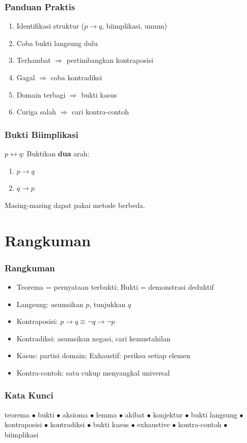 \documentclass[handout]{beamer}
\theoremstyle{definition}
\theoremstyle{example}
\begin{document}
\begin{frame}
\frametitle{Panduan Praktis}
\begin{enumerate}
  \item Identifikasi struktur ($p \to q$, biimplikasi, umum)
  \item Coba bukti langsung dulu
  \item Terhambat $\Rightarrow$ pertimbangkan kontraposisi
  \item Gagal $\Rightarrow$ coba kontradiksi
  \item Domain terbagi $\Rightarrow$ bukti kasus
  \item Curiga salah $\Rightarrow$ cari kontra-contoh
\end{enumerate}
\end{frame}

\begin{frame}
\frametitle{Bukti Biimplikasi}
$p \leftrightarrow q$: Buktikan \textbf{dua} arah:
\begin{enumerate}
  \item $p \to q$
  \item $q \to p$
\end{enumerate}
Masing-masing dapat pakai metode berbeda.
\end{frame}

\section{Rangkuman}

\begin{frame}
\frametitle{Rangkuman}
\begin{itemize}
  \item Teorema = pernyataan terbukti; Bukti = demonstrasi deduktif
  \item Langsung: asumsikan $p$, tunjukkan $q$
  \item Kontraposisi: $p \to q \equiv \neg q \to \neg p$
  \item Kontradiksi: asumsikan negasi, cari kemustahilan
  \item Kasus: partisi domain; Exhaustif: periksa setiap elemen
  \item Kontra-contoh: satu cukup menyangkal universal
\end{itemize}
\end{frame}

\begin{frame}
\frametitle{Kata Kunci}
\begin{center}
\small
teorema $\bullet$ bukti $\bullet$ aksioma $\bullet$ lemma $\bullet$ akibat $\bullet$ konjektur $\bullet$ bukti langsung $\bullet$ kontraposisi $\bullet$ kontradiksi $\bullet$ bukti kasus $\bullet$ exhaustive $\bullet$ kontra-contoh $\bullet$ biimplikasi
\end{center}
\end{frame}
\end{document}
